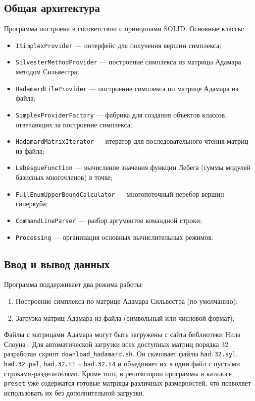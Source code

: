 \documentclass[a4paper,12pt]{article}
\theoremstyle{indented}
\begin{document}
\subsection{Общая архитектура}

Программа построена в соответствии с принципами SOLID. Основные классы:

\begin{itemize}
    \item \texttt{ISimplexProvider} — интерфейс для получения вершин симплекса;
    \item \texttt{SilvesterMethodProvider} — построение симплекса из матрицы Адамара методом Сильвестра;
    \item \texttt{HadamardFileProvider} — построение симплекса по матрице Адамара из файла;
    \item \texttt{SimplexProviderFactory} — фабрика для создания объектов классов, отвечающих за построение симплекса;
    \item \texttt{HadamardMatrixIterator} — итератор для последовательного чтения матриц из файла;
    \item \texttt{LebesgueFunction} — вычисление значения функции Лебега (суммы модулей базисных многочленов) в точке;
    \item \texttt{FullEnumUpperBoundCalculator} — многопоточный перебор вершин гиперкуба;
    \item \texttt{CommandLineParser} — разбор аргументов командной строки;
    \item \texttt{Processing} — организация основных вычислительных режимов.
\end{itemize}

\subsection{Ввод и вывод данных}

Программа поддерживает два режима работы:
\begin{enumerate}
    \item Построение симплекса по матрице Адамара Сильвестра (по умолчанию);
    \item Загрузка матриц Адамара из файла (символьный или числовой формат);
\end{enumerate}

Файлы с матрицами Адамара могут быть загружены с сайта библиотеки Нила Слоуна \cite{sloane_hadamard}. Для автоматической загрузки всех доступных матриц порядка 32 разработан скрипт \texttt{download\_hadamard.sh}. Он скачивает файлы \texttt{had.32.syl}, \texttt{had.32.pal}, \texttt{had.32.t1} – \texttt{had.32.t4} и объединяет их в один файл с пустыми строками-разделителями. Кроме того, в репозитории программы в каталоге \texttt{preset} уже содержатся готовые матрицы различных размерностей, что позволяет использовать их без дополнительной загрузки.
\end{document}
